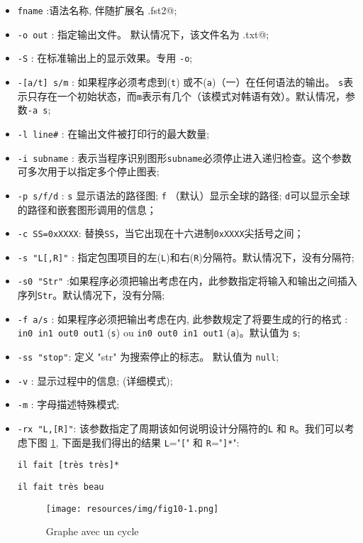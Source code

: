 \begin{itemize}
  \item \verb$fname$ :语法名称, 伴随扩展名 \verb@.fst2@;
  \item \verb$-o out$ : 指定输出文件。 默认情况下，该文件名为
  	  \verb@lst.txt@;
  \item \verb$-S$ : 在标准输出上的显示效果。专用 \verb$-o$;
  \item \verb$-[a/t] s/m$ : 如果程序必须考虑到(\verb$t$) 或不(\verb$a$)（一）在任何语法的输出。 \verb$s$表示只存在一个初始状态，而\verb$m$表示有几个（该模式对韩语有效）。默认情况，参数\verb$-a s$;

  \item \verb$-l line#$ : 在输出文件被打印行的最大数量;
  \item \verb$-i subname$ : 表示当程序识别图形\verb$subname$必须停止进入递归检查。这个参数可多次用于以指定多个停止图表;
  
  \item \verb$-p s/f/d$ : \verb$s$ 显示语法的路径图; \verb$f$ （默认）显示全球的路径; \verb$d$可以显示全球的路径和嵌套图形调用的信息；

  \item \verb$-c SS=0xXXXX$: 替换\verb$SS$，当它出现在十六进制\verb$0xXXXX$尖括号之间； 

  \item \verb$-s "L[,R]"$ : 指定包围项目的左(\verb$L$)和右(\verb$R$)分隔符。默认情况下，没有分隔符;

  \item \verb$-s0 "Str"$ :如果程序必须把输出考虑在内，此参数指定将输入和输出之间插入序列\verb$Str$。默认情况下，没有分隔;

  \item \verb$-f a/s$ : 如果程序必须把输出考虑在内, 此参数规定了将要生成的行的格式 :
  \verb$in0 in1 out0 out1$ (\verb$s$) ou \verb$in0 out0 in1 out1$ (\verb$a$)。默认值为 \verb$s$;
  
\item \verb$-ss "stop"$: 定义 "str" 为搜索停止的标志。
	默认值为 \verb$null$;

  \item \verb$-v$ : 显示过程中的信息; (详细模式);
  
  \item \verb$-m$ : 字母描述特殊模式;
  	  
  \item \verb$-rx "L,[R]"$: 该参数指定了周期该如何说明设计分隔符的\verb$L$ 和 \verb$R$。我们可以考虑下图 \ref{cycle},
  	  下面是我们得出的结果 \verb$L$="\verb$[$" 和 \verb$R$="\verb$]*$":

  \medskip
  \noindent
  \texttt{il fait [tr\`es tr\`es]*}
  
  \noindent
  \texttt{il fait tr\`es beau}

\begin{figure}[h]
\begin{center}
\texttt{[image: resources/img/fig10-1.png]}
\caption{Graphe avec un cycle\label{cycle}}
\end{center}
\end{figure}

\end{itemize}
